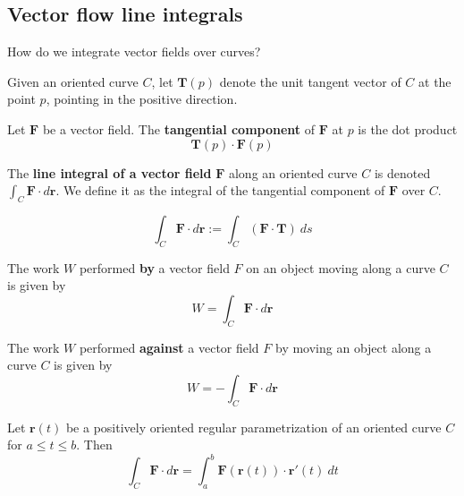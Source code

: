 \subsection{Vector flow line integrals}


\begin{motivating}
    How do we integrate vector fields over curves?
\end{motivating}

\begin{definition}
    Given an oriented curve $C$, let $\bm{T}(p)$ denote the unit tangent vector of $C$ at the point $p$, pointing in the positive direction.  
    
    \vspace{.5em}
    
    Let $\bm{F}$ be a vector field.  The \textbf{tangential component} of $\bm{F}$ at $p$ is the dot product 
    $$\bm{T}(p) \cdot \bm{F}(p)$$
    
    \end{definition}

\begin{definition}
        The \textbf{line integral of a vector field} $\bm{F}$ along an oriented curve $C$ is denoted $\int_C \bm{F} \cdot d\bm{r}$.  We define it as the integral of the tangential component of $\bm{F}$ over $C$.
        
    $$\int_C \bm{F} \cdot d\bm{r} := \int_C (\bm{F} \cdot \bm{T}) \ ds $$
    \end{definition}

\begin{example}
    The work $W$ performed \textbf{by} a vector field $F$ on an object moving along a curve $C$ is given by $$W = \int_C \bm{F} \cdot d\bm{r}$$
    \end{example}



    \begin{example}
    The work $W$ performed \textbf{against} a vector field $F$ by moving an object along a curve $C$ is given by $$W = - \int_C \bm{F} \cdot d\bm{r}$$
    \end{example}

\begin{theorem}
    Let $\bm{r}(t)$ be a positively oriented regular parametrization of an oriented curve $C$ for $a \leq t \leq b$.  Then
    $$\int_C \bm{F} \cdot d\bm{r} = \int_a^b \bm{F}(\bm{r}(t)) \cdot \bm{r}'(t) \ dt$$
    
    \end{theorem}
    
